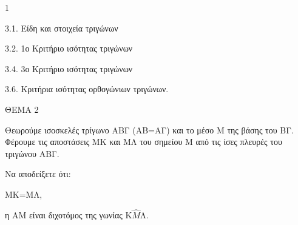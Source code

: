 \begin{ylh}{1}
    \item 3.1. Είδη και στοιχεία τριγώνων
    \item 3.2. 1ο Κριτήριο ισότητας τριγώνων
    \item 3.4. 3ο Κριτήριο ισότητας τριγώνων
    \item 3.6. Κριτήρια ισότητας ορθογώνιων τριγώνων.
\end{ylh}

ΘΕΜΑ 2

Θεωρούμε ισοσκελές τρίγωνο ΑΒΓ (ΑΒ=ΑΓ) και το μέσο Μ της βάσης του ΒΓ. Φέρουμε τις αποστάσεις ΜΚ και ΜΛ του σημείου Μ από τις ίσες πλευρές του τριγώνου ΑΒΓ.

Να αποδείξετε ότι:

\begin{alist}
\item ΜΚ=ΜΛ, 

\item η ΑΜ είναι διχοτόμος της γωνίας Κ$\widehat{Μ}$Λ. 
\end{alist}
